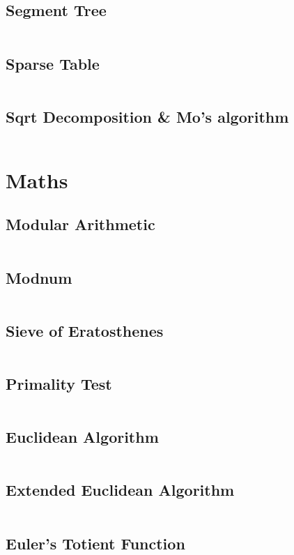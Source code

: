   \subsection{Segment Tree}
    \inputminted{cpp}{library/structures/segment_tree.cpp}
  \subsection{Sparse Table}
    \inputminted{cpp}{library/structures/sparse_table.hpp}
  \subsection{Sqrt Decomposition \& Mo's algorithm}
    \inputminted{cpp}{library/structures/mo.cpp}

\section{Maths}
  \subsection{Modular Arithmetic}
    \inputminted{cpp}{library/maths/mod.hpp}
  \subsection{Modnum}
    \inputminted{cpp}{library/maths/modnum.hpp}
  \subsection{Sieve of Eratosthenes}
    \inputminted{cpp}{library/maths/sieve.cpp}
  \subsection{Primality Test}
      \inputminted{cpp}{library/maths/primality.hpp}
  \subsection{Euclidean Algorithm}
    \inputminted{cpp}{library/maths/euclidean.hpp}
  \subsection{Extended Euclidean Algorithm}
    \inputminted{cpp}{library/maths/extended_euclidean.hpp}
  \subsection{Euler's Totient Function}
    \inputminted{cpp}{library/maths/euler_phi.hpp}
